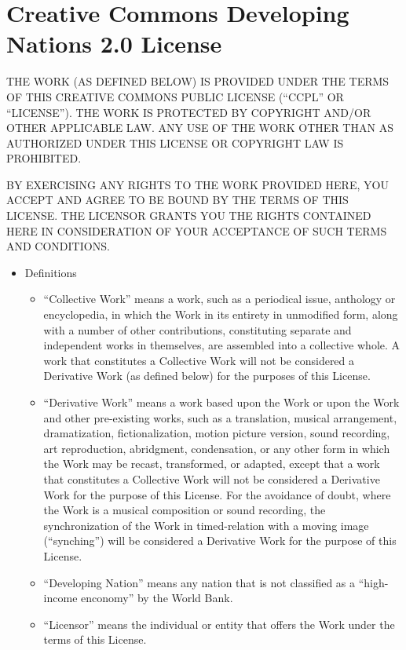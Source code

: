 \documentclass{article}
\begin{document}
\section{Creative Commons Developing Nations 2.0 License}

THE WORK (AS DEFINED BELOW) IS PROVIDED UNDER THE TERMS OF THIS
CREATIVE COMMONS PUBLIC LICENSE (``CCPL'' OR ``LICENSE'').  THE WORK
IS PROTECTED BY COPYRIGHT AND/OR OTHER APPLICABLE LAW.  ANY USE OF THE
WORK OTHER THAN AS AUTHORIZED UNDER THIS LICENSE OR COPYRIGHT LAW IS
PROHIBITED.

BY EXERCISING ANY RIGHTS TO THE WORK PROVIDED HERE, YOU ACCEPT AND
AGREE TO BE BOUND BY THE TERMS OF THIS LICENSE.  THE LICENSOR GRANTS
YOU THE RIGHTS CONTAINED HERE IN CONSIDERATION OF YOUR ACCEPTANCE OF
SUCH TERMS AND CONDITIONS.

\begin{itemize} \item Definitions

\begin{itemize} \item ``Collective Work'' means a work, such as a
periodical issue, anthology or encyclopedia, in which the Work in its
entirety in unmodified form, along with a number of other
contributions, constituting separate and independent works in
themselves, are assembled into a collective whole.  A work that
constitutes a Collective Work will not be considered a Derivative Work
(as defined below) for the purposes of this License.

\item ``Derivative Work'' means a work based upon the Work or upon the
Work and other pre-existing works, such as a translation, musical
arrangement, dramatization, fictionalization, motion picture version,
sound recording, art reproduction, abridgment, condensation, or any
other form in which the Work may be recast, transformed, or adapted,
except that a work that constitutes a Collective Work will not be
considered a Derivative Work for the purpose of this License.  For the
avoidance of doubt, where the Work is a musical composition or sound
recording, the synchronization of the Work in timed-relation with a
moving image (``synching'') will be considered a Derivative Work for
the purpose of this License.

\item ``Developing Nation'' means any nation that is not classified as
a ``high-income enconomy'' by the World Bank.

\item ``Licensor'' means the individual or entity that offers the Work
under the terms of this License.


\end{itemize}
\end{itemize}
\end{document}
